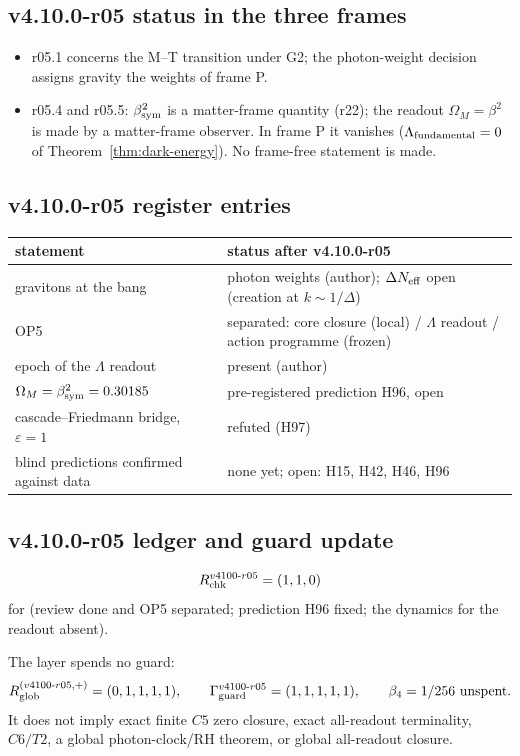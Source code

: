 \subsection*{v4.10.0-r05 status in the three frames}
\label{subsec:v4100-r05-frames}

\begin{itemize}[leftmargin=2em]
\item r05.1 concerns the M--T transition under G2; the photon-weight decision assigns gravity the weights of frame P.
\item r05.4 and r05.5: \(\beta_{\rm sym}^2\) is a matter-frame quantity (r22); the readout \(\Omega_M=\beta^2\) is made by a matter-frame observer.  In frame P it
vanishes (\(\Lambda_{\rm fundamental}=0\) of Theorem~\ref{thm:dark-energy}).  No frame-free statement is made.
\end{itemize}

\subsection*{v4.10.0-r05 register entries}
\label{subsec:v4100-r05-register}

\begin{center}
\small
\begin{tabular}{@{}>{\raggedright\arraybackslash}p{}>{\raggedright\arraybackslash}p{}@{}}
\toprule
statement & status after v4.10.0-r05\\
\midrule
gravitons at the bang & photon weights (author); \(\Delta N_{\rm eff}\) open (creation at \(k\sim1/\Delta\))\\
OP5 & separated: core closure (local) / \(\Lambda\) readout / action programme (frozen)\\
epoch of the \(\Lambda\) readout & present (author)\\
\(\Omega_M=\beta_{\rm sym}^2=0.30185\) & pre-registered prediction H96, open\\
cascade--Friedmann bridge, \(\varepsilon=1\) & refuted (H97)\\
blind predictions confirmed against data & none yet; open: H15, H42, H46, H96\\
\bottomrule
\end{tabular}
\end{center}

\subsection*{v4.10.0-r05 ledger and guard update}
\label{subsec:v4100-r05-ledger-guard}

\[
R_{\rm chk}^{v4100\text{-}r05}=(1,1,0)
\]
for (review done and OP5 separated; prediction H96 fixed; the dynamics for the readout absent).

The layer spends no guard:
\[
R_{\rm glob}^{(v4100\text{-}r05,+)}=(0,1,1,1,1),
\qquad
\Gamma_{\rm guard}^{v4100\text{-}r05}=(1,1,1,1,1),
\qquad
\beta_4=1/256\ \text{unspent}.
\]
It does not imply exact finite \(C5\) zero closure, exact all-readout terminality,
\(C6/T2\), a global photon-clock/RH theorem, or global all-readout closure.
